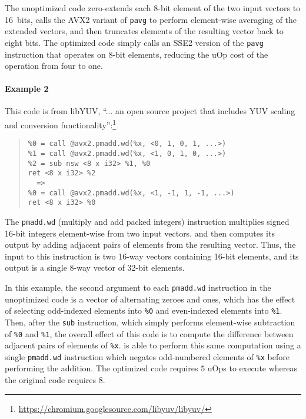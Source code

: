 The unoptimized code zero-extends each 8-bit element of the two input
vectors to 16~bits, calls the AVX2 variant of \texttt{pavg} to perform
element-wise averaging of the extended vectors, and then truncates
elements of the resulting vector back to eight bits.
%
The optimized code simply calls an SSE2 version of the \texttt{pavg}
instruction that operates on 8-bit elements, reducing the uOp cost
of the operation from four to one.


\paragraph{Example 2}

This code is from libYUV, ``... an open source project that includes
YUV scaling and conversion
functionality'':\footnote{\url{https://chromium.googlesource.com/libyuv/libyuv/}}

{\small\begin{quote}\begin{verbatim}
%0 = call @avx2.pmadd.wd(%x, <0, 1, 0, 1, ...>)
%1 = call @avx2.pmadd.wd(%x, <1, 0, 1, 0, ...>)
%2 = sub nsw <8 x i32> %1, %0
ret <8 x i32> %2
  =>
%0 = call @avx2.pmadd.wd(%x, <1, -1, 1, -1, ...>)
ret <8 x i32> %0
\end{verbatim}
\end{quote}}

The \texttt{pmadd.wd} (multiply and add packed integers) instruction multiplies
signed 16-bit integers element-wise from two input vectors, and then
computes its output by adding adjacent pairs of elements from the
resulting vector.
%
Thus, the input to this instruction is two 16-way vectors containing
16-bit elements, and its output is a single 8-way vector of 32-bit
elements.


In this example, the second argument to each \texttt{pmadd.wd}
instruction in the unoptimized code is a vector of alternating zeroes
and ones, which has the effect of selecting odd-indexed elements into
\texttt{\%0} and even-indexed elements into \texttt{\%1}.
%
Then, after the \texttt{sub} instruction, which simply performs
element-wise subtraction of \texttt{\%0} and \texttt{\%1}, the overall
effect of this code is to compute the difference between adjacent
pairs of elements of \texttt{\%x}.
%
\tool{} is able to perform this same computation using a single
\texttt{pmadd.wd} instruction which negates odd-numbered elements of
\texttt{\%x} before performing the addition.
%
The optimized code requires $5$ uOps to execute whereas the original
code requires $8$.

